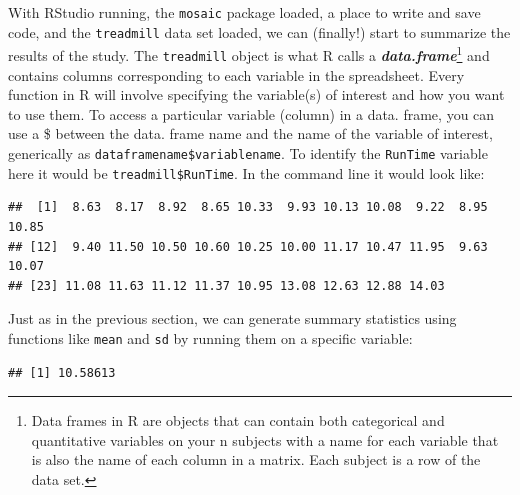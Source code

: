 \documentclass[]{book}
\newenvironment{Shaded}{\begin{snugshade}}{\end{snugshade}}
\newcommand{\KeywordTok}[1]{\textcolor[rgb]{0.13,0.29,0.53}{\textbf{{#1}}}}
\newcommand{\NormalTok}[1]{{#1}}
\let\rmarkdownfootnote\footnote%
\def\footnote{\protect\rmarkdownfootnote}
\begin{document}
With RStudio running, the \texttt{mosaic} package loaded, a place to
write and save code, and the \texttt{treadmill} data set loaded, we can
(finally!) start to summarize the results of the study. The
\texttt{treadmill} object is what R calls a
\textbf{\emph{data.frame}}\footnote{Data frames in R are objects that
  can contain both categorical and quantitative variables on your n
  subjects with a name for each variable that is also the name of each
  column in a matrix. Each subject is a row of the data set.} and
contains columns corresponding to each variable in the spreadsheet.
Every function in R will involve specifying the variable(s) of interest
and how you want to use them. To access a particular variable (column)
in a data. frame, you can use a \$ between the data. frame name and the
name of the variable of interest, generically as
\texttt{dataframename\$variablename}. To identify the \texttt{RunTime}
variable here it would be \texttt{treadmill\$RunTime}. In the command
line it would look like:

\begin{Shaded}
\end{Shaded}

\begin{verbatim}
##  [1]  8.63  8.17  8.92  8.65 10.33  9.93 10.13 10.08  9.22  8.95 10.85
## [12]  9.40 11.50 10.50 10.60 10.25 10.00 11.17 10.47 11.95  9.63 10.07
## [23] 11.08 11.63 11.12 11.37 10.95 13.08 12.63 12.88 14.03
\end{verbatim}

Just as in the previous section, we can generate summary statistics
using functions like \texttt{mean} and \texttt{sd} by running them on a
specific variable:

\begin{Shaded}
\end{Shaded}

\begin{verbatim}
## [1] 10.58613
\end{verbatim}

\begin{Shaded}
\end{Shaded}
\end{document}
